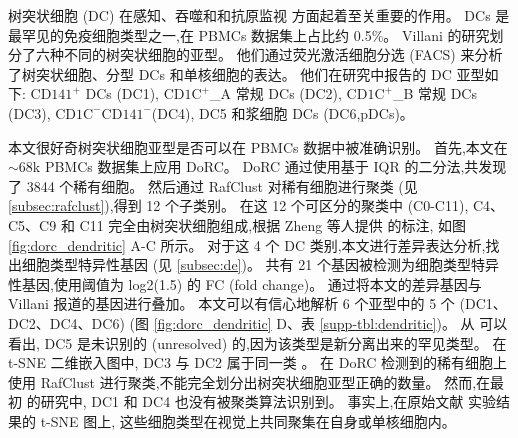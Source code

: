 树突状细胞 (DC) 在感知、吞噬和和抗原监视  方面起着至关重要的作用。
DCs 是最罕见的免疫细胞类型之一,在 PBMCs  数据集上占比约 0.5\%。
Villani  的研究划分了六种不同的树突状细胞的亚型。
他们通过荧光激活细胞分选 (FACS) 来分析了树突状细胞、分型 DCs 和单核细胞的表达。
他们在研究中报告的 DC 亚型如下:
$\text{CD141}^+$ DCs (DC1), 
$\text{CD1C}^+${\_}A 常规 DCs (DC2),
$\text{CD1C}^+${\_}B 常规 DCs (DC3),
$\text{CD1C}^-\text{CD141}^-$(DC4), DC5 和浆细胞 DCs (DC6,pDCs)。

本文很好奇树突状细胞亚型是否可以在 PBMCs 数据中被准确识别。
首先,本文在 ${\sim}68$k PBMCs 数据集上应用 DoRC。
DoRC 通过使用基于 IQR 的二分法,共发现了 3844 个稀有细胞。
然后通过 RafClust 对稀有细胞进行聚类 (见 \ref{subsec:rafclust}),得到 12 个子类别。
在这 12 个可区分的聚类中 (C0-C11),
C4、C5、C9 和 C11 完全由树突状细胞组成,根据 Zheng 等人提供 的标注,
如图 \ref{fig:dorc_dendritic} A-C 所示。
对于这 4 个 DC 类别,本文进行差异表达分析,找出细胞类型特异性基因 (见 \ref{subsec:de})。
共有 21 个基因被检测为细胞类型特异性基因,使用阈值为 log2(1.5) 的 FC (fold change)。
通过将本文的差异基因与 Villani  报道的基因进行叠加。
本文可以有信心地解析 6 个亚型中的 5 个 (DC1、DC2、DC4、DC6) (图 \ref{fig:dorc_dendritic} D、表 \ref{supp-tbl:dendritic})。
从  可以看出, DC5 是未识别的 (unresolved) 的,因为该类型是新分离出来的罕见类型。
在 t-SNE 二维嵌入图中, DC3 与 DC2 属于同一类 。
在 DoRC 检测到的稀有细胞上使用 RafClust 进行聚类,不能完全划分出树突状细胞亚型正确的数量。
然而,在最初 的研究中, DC1 和 DC4 也没有被聚类算法识别到。
事实上,在原始文献  实验结果的 t-SNE 图上,
这些细胞类型在视觉上共同聚集在自身或单核细胞内。
